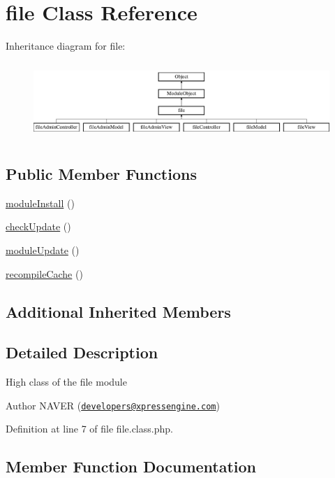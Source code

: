 \hypertarget{classfile}{}\section{file Class Reference}
\label{classfile}
Inheritance diagram for file\+:\begin{figure}[H]
\begin{center}
\leavevmode
\includegraphics[height=2.916667cm]{classfile}
\end{center}
\end{figure}
\subsection*{Public Member Functions}
\begin{DoxyCompactItemize}
\item 
\hyperlink{classfile_a5e8c34a5d2187f2a332a88e112c90bdc}{module\+Install} ()
\item 
\hyperlink{classfile_ad9420bb93d958cdd9741a27137f9cf2a}{check\+Update} ()
\item 
\hyperlink{classfile_a13a5d2858426d421327f744555fec4fb}{module\+Update} ()
\item 
\hyperlink{classfile_abdd4624fd45f101cdf4009eeda3cc1ab}{recompile\+Cache} ()
\end{DoxyCompactItemize}
\subsection*{Additional Inherited Members}


\subsection{Detailed Description}
High class of the file module \begin{DoxyAuthor}{Author}
N\+A\+V\+ER (\href{mailto:developers@xpressengine.com}{\tt developers@xpressengine.\+com}) 
\end{DoxyAuthor}


Definition at line 7 of file file.\+class.\+php.



\subsection{Member Function Documentation}
